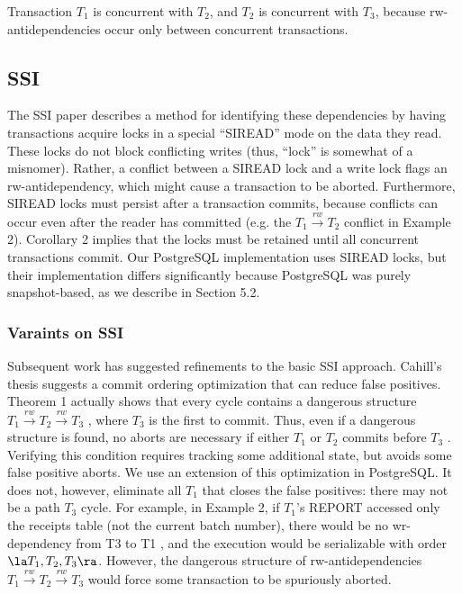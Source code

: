 \documentclass[11pt]{article}
\begin{document}
\begin{corollary}[]
Transaction \(T_1\) is concurrent with \(T_2\), and \(T_2\) is concurrent with \(T_3\), because
rw-antidependencies occur only between concurrent transactions.
\end{corollary}
\subsection{SSI}
\label{sec:org94b8d3e}
The SSI paper describes a method for identifying these dependencies by having transactions acquire
locks in a special “SIREAD” mode on the data they read. These locks do not block conflicting writes
(thus, “lock” is somewhat of a misnomer). Rather, a conflict between a SIREAD lock and a write lock
flags an rw-antidependency, which might cause a transaction to be aborted. Furthermore, SIREAD locks
must persist after a transaction commits, because conflicts can occur even after the reader has
committed (e.g. the \(T_1\xrightarrow{rw}T_2\) conflict in Example 2). Corollary 2 implies that the
locks must be retained until all concurrent transactions commit. Our PostgreSQL implementation uses
SIREAD locks, but their implementation differs significantly because PostgreSQL was purely
snapshot-based, as we describe in Section 5.2.
\subsubsection{Varaints on SSI}
\label{sec:org2652dcf}
Subsequent work has suggested refinements to the basic SSI approach. Cahill’s thesis suggests a commit
ordering optimization that can reduce false positives. Theorem 1 actually shows that every cycle
contains a dangerous structure \(T_1\xrightarrow{rw}T_2\xrightarrow{rw}T_3\) , where \(T_3\) is the
first to commit. Thus, even if a dangerous structure is found, no aborts are necessary if either
\(T_1\) or \(T_2\) commits before \(T_3\) . Verifying this condition requires tracking some additional
state, but avoids some false positive aborts. We use an extension of this optimization in PostgreSQL.
It does not, however, eliminate all \(T_1\) that closes the false positives: there may not be a path
\(T_3\) cycle. For example, in Example 2, if \(T_1\)'s REPORT accessed only the receipts table (not
the current batch number), there would be no wr-dependency from T3 to T1 , and the execution would be
serializable with order \(\la T_1,T_2,T_3\ra\). However, the dangerous structure of
rw-antidependencies \(T_1\xrightarrow{rw}T_2\xrightarrow{rw}T_3\) would force some transaction to be
spuriously aborted.
\end{document}
